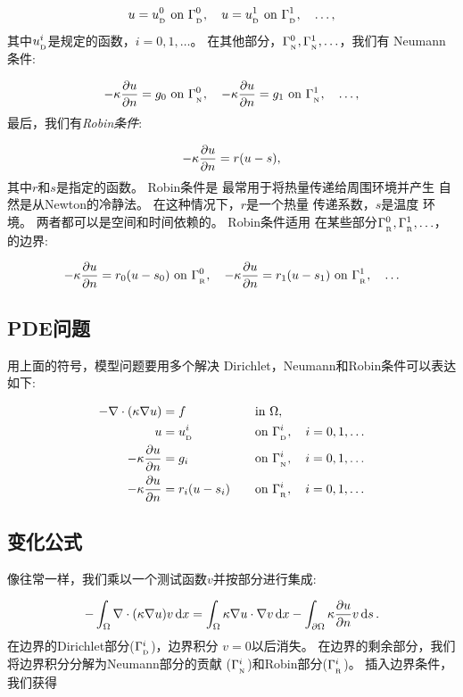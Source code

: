 \[ u = u_{_\mathrm{D}}^0\hbox{ on }\Gamma_{_\mathrm{D}}^0,\quad
u = u_{_\mathrm{D}}^1\hbox{ on }\Gamma_{_\mathrm{D}}^1, \quad \ldots,\]
其中$u_{_\mathrm{D}}^i$是规定的函数，$i=0,1, \ldots$。
在其他部分，$\Gamma_{_\mathrm{N}}^0, \Gamma_{_\mathrm{N}}^1, \ldots$，我们有
Neumann条件:

\[ -\kappa{\partial u\over\partial n} = g_{0}\hbox{ on }\Gamma_{_\mathrm{N}}^0,\quad
-\kappa{\partial u\over\partial n} = g_{1}\hbox{ on }\Gamma_{_\mathrm{N}}^1,\quad \ldots,
\]
最后，我们有\emph{Robin条件}:

\begin{equation*}
-\kappa{\partial u\over\partial n} = r(u-s),
\label{ch:poisson0:multi:bc:Robin}
\end{equation*}
其中$r$和$s$是指定的函数。 Robin条件是
最常用于将热量传递给周围环境并产生
自然是从Newton的冷静法。 在这种情况下，$r$是一个热量
传递系数，$s$是温度
环境。 两者都可以是空间和时间依赖的。
Robin条件适用
在某些部分$\Gamma_{_\mathrm{R}}^0, \Gamma_{_\mathrm{R}}^1, \ldots$，的边界:

\[ -\kappa{\partial u\over\partial n} = r_0(u-s_0)\hbox{ on }\Gamma_{_\mathrm{R}}^0,\quad
-\kappa{\partial u\over\partial n} = r_1(u-s_1)\hbox{ on }\Gamma_{_\mathrm{R}}^1,\quad \ldots
\]

\subsection{PDE问题}

用上面的符号，模型问题要用多个解决
Dirichlet，Neumann和Robin条件可以表达如下:

\begin{alignat}{2}
-\nabla\cdot(\kappa\nabla u) &= f \quad&&\mbox{in } \Omega, \label{ch:poisson0:2D:DN3}\\
u &= u_{_\mathrm{D}}^i &&\mbox{on } \Gamma_{_\mathrm{D}}^i,\quad i=0,1,\ldots
\label{ch:poisson0:2D:DN3:bcD}\\
-\kappa{\partial u\over\partial n} &= g_i &&\mbox{on } \Gamma_{_\mathrm{N}}^i,\quad
i=0,1,\ldots
\label{ch:poisson0:2D:DN3:bcN}\\
-\kappa{\partial u\over\partial n} &= r_i(u-s_i) \quad&&\mbox{on } \Gamma_{_\mathrm{R}}^i,\quad
i=0,1,\ldots
\label{ch:poisson0:2D:DN3:bcR}
\end{alignat}

\subsection{变化公式}

像往常一样，我们乘以一个测试函数$v$并按部分进行集成:

\begin{equation*}
 -\int_\Omega \nabla\cdot(\kappa\nabla u) v \, \mathrm{d}x
= \int_\Omega \kappa\nabla u\cdot \nabla v \, \mathrm{d}x -
\int_{\partial\Omega}\kappa\frac{\partial u}{\partial n}v \, \mathrm{d}s\thinspace .
\end{equation*}
在边界的Dirichlet部分($\Gamma_{_\mathrm{D}}^i$)，边界积分
$v = 0$以后消失。 在边界的剩余部分，我们
将边界积分分解为Neumann部分的贡献
($\Gamma_{_\mathrm{N}}^i$)和Robin部分($\Gamma_{_\mathrm{R}}^i$)。 插入边界条件，
我们获得

